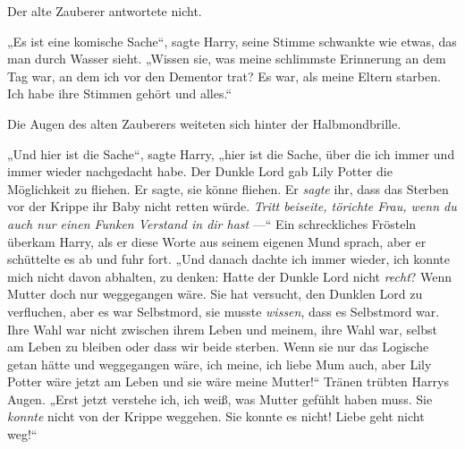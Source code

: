 Der alte Zauberer antwortete nicht.

„Es ist eine komische Sache“, sagte Harry, seine Stimme schwankte wie etwas, das man durch Wasser sieht.
„Wissen sie, was meine schlimmste Erinnerung an dem Tag war, an dem ich vor den Dementor trat? Es war, als meine Eltern starben. Ich habe ihre Stimmen gehört und alles.“

Die Augen des alten Zauberers weiteten sich hinter der Halbmondbrille.

„Und hier ist die Sache“, sagte Harry, „hier ist die Sache, über die ich immer und immer wieder nachgedacht habe. Der Dunkle Lord gab Lily Potter die Möglichkeit zu fliehen. Er sagte, sie könne fliehen. Er \emph{sagte} ihr, dass das Sterben vor der Krippe ihr Baby nicht retten würde. \emph{Tritt beiseite, törichte Frau, wenn du auch nur einen Funken Verstand in dir hast} —“
Ein schreckliches Frösteln überkam Harry, als er diese Worte aus seinem eigenen Mund sprach, aber er schüttelte es ab und fuhr fort.
„Und danach dachte ich immer wieder, ich konnte mich nicht davon abhalten, zu denken: Hatte der Dunkle Lord nicht \emph{recht}? Wenn Mutter doch nur weggegangen wäre. Sie hat versucht, den Dunklen Lord zu verfluchen, aber es war Selbstmord, sie musste \emph{wissen}, dass es Selbstmord war. Ihre Wahl war nicht zwischen ihrem Leben und meinem, ihre Wahl war, selbst am Leben zu bleiben oder dass wir beide sterben. Wenn sie nur das Logische getan hätte und weggegangen wäre, ich meine, ich liebe Mum auch, aber Lily Potter wäre jetzt am Leben und sie wäre meine Mutter!“
Tränen trübten Harrys Augen.
„Erst jetzt verstehe ich, ich weiß, was Mutter gefühlt haben muss. Sie \emph{konnte} nicht von der Krippe weggehen. Sie konnte es nicht! Liebe geht nicht weg!“

